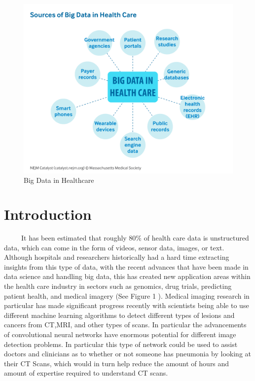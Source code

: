 \documentclass[12pt]{article}
\begin{document}
\begin{figure}

{\centering \includegraphics[width=0.75\linewidth,height=0.25\textheight]{images/big-data-healthcare} 

}

\caption{Big Data in Healthcare}\label{fig:sample-fig1}
\end{figure}

\hypertarget{introduction}{%
\section{Introduction}\label{introduction}}

~~~~~It has been estimated that roughly 80\% of health care data is
unstructured data, which can come in the form of videos, sensor data,
images, or text. Although hospitals and researchers historically had a
hard time extracting insights from this type of data, with the recent
advances that have been made in data science and handling big data, this
has created new application areas within the health care industry in
sectors such as genomics, drug trials, predicting patient health, and
medical imagery (See Figure 1 \citep{NEJM}). Medical imaging research in
particular has made significant progress recently with scientists being
able to use different machine learning algorithms to detect different
types of lesions and cancers from CT,MRI, and other types of scans. In
particular the advancements of convolutional neural networks have
enormous potential for different image detection problems. In particular
this type of network could be used to assist doctors and clinicians as
to whether or not someone has pneumonia by looking at their CT Scans,
which would in turn help reduce the amount of hours and amount of
expertise required to understand CT scans.
\end{document}
